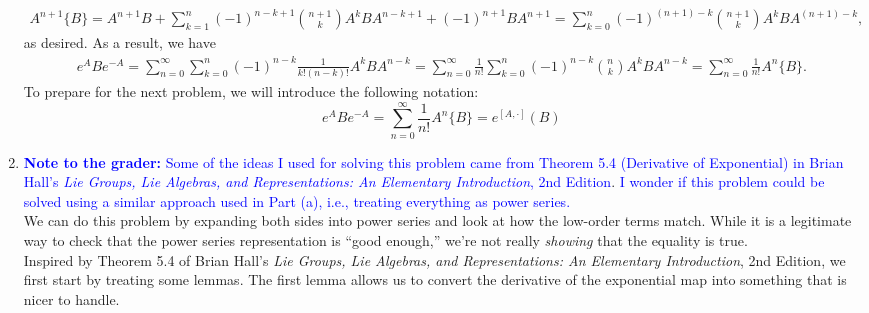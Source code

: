 \documentclass{article}
\theoremstyle{definition}
\newcommand{\f}[2]{\frac{#1}{#2}}
\begin{document}
\begin{enumerate}[label=(\alph*)]
\begin{align*}
	A^{n+1}\{B\} 
	= A^{n+1}B + \sum^{n}_{k=1} (-1)^{n-k+1} {{n+1}\choose{k}} A^{k} B A^{n-k+1} + (-1)^{n+1} B A^{n+1} 
	= \sum^{n}_{k=0} (-1)^{(n+1)-k} {{n+1}\choose {k}} A^k B A^{(n+1)-k},
	\end{align*}
	as desired. As a result, we have 
	\begin{align*}
	e^A B e^{-A} 
	= \sum^\infty_{n=0} \sum^n_{k=0} (-1)^{n-k}\f{1}{k!(n-k)!}A^k B A^{n-k}
	= \sum^\infty_{n=0} \f{1}{n!} \sum^n_{k=0} (-1)^{n-k}{n\choose k}A^k B A^{n-k}
	= \sum^\infty_{n=0} \f{1}{n!} A^n\{B\}.
	\end{align*}
	To prepare for the next problem, we will introduce the following notation:
	\begin{equation*}
	e^A B e^{-A} = \sum^\infty_{n=0} \f{1}{n!} A^n\{B\} = e^{[A,\cdot]}(B)
	\end{equation*}

	
	
	\item \textcolor{blue}{\textbf{Note to the grader:} Some of the ideas I used for solving this problem came from Theorem 5.4 (Derivative of Exponential) in Brian Hall's \textit{Lie Groups, Lie Algebras, and Representations: An Elementary Introduction}, 2nd Edition}. \textcolor{blue}{I wonder if this problem could be solved using a similar approach used in Part (a), i.e., treating everything as power series.}\\
	
	We can do this problem by expanding both sides into power series and look at how the low-order terms match. While it is a legitimate way to check that the power series representation is ``good enough,'' we're not really \textit{showing} that the equality is true. \\
	
	Inspired by Theorem 5.4 of Brian Hall's \textit{Lie Groups, Lie Algebras, and Representations: An Elementary Introduction}, 2nd Edition, we first start by treating some lemmas. The first lemma allows us to convert the derivative of the exponential map into something that is nicer to handle.
	

\end{enumerate}
\end{document}

